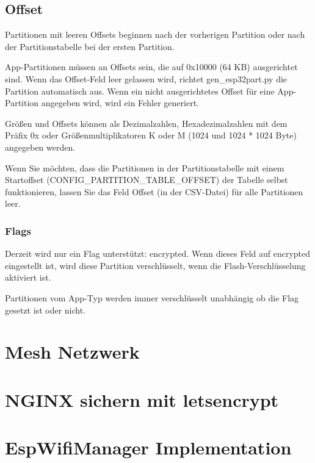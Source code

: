 \subsection{Offset}
Partitionen mit leeren Offsets beginnen nach der vorherigen Partition oder nach der Partitionstabelle bei der ersten Partition.

App-Partitionen müssen an Offsets sein, die auf 0x10000 (64 KB) ausgerichtet sind. Wenn das Offset-Feld leer gelassen wird, richtet gen\_esp32part.py die Partition automatisch aus. Wenn ein nicht ausgerichtetes Offset für eine App-Partition angegeben wird, wird ein Fehler generiert.

Größen und Offsets können als Dezimalzahlen, Hexadezimalzahlen mit dem Präfix 0x oder Größenmultiplikatoren K oder M (1024 und 1024 * 1024 Byte) angegeben werden.

Wenn Sie möchten, dass die Partitionen in der Partitionstabelle mit einem Startoffset (CONFIG\_PARTITION\_TABLE\_OFFSET) der Tabelle selbst funktionieren, lassen Sie das Feld Offset (in der CSV-Datei) für alle Partitionen leer.

\subsubsection{Flags}
Derzeit wird nur ein Flag unterstützt: encrypted. Wenn dieses Feld auf encrypted eingestellt ist, wird diese Partition verschlüsselt, wenn die Flash-Verschlüsselung aktiviert ist.

Partitionen vom App-Typ werden immer verschlüsselt unabhängig ob die Flag gesetzt ist oder nicht.\cite{espressif_partition_tables}


\section{Mesh Netzwerk}\label{sec:mesh}

\section{NGINX sichern mit letsencrypt}

\section{EspWifiManager Implementation}

